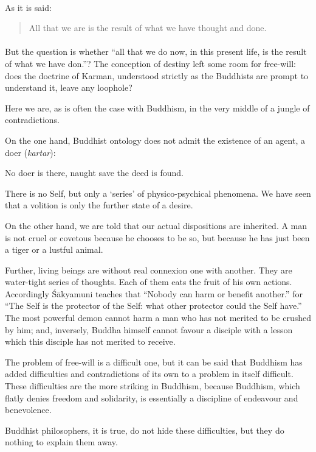 \documentclass[a4paper, 11pt, oneside, english, landscape]{article}
\begin{document}
\paragraph{}
As it is said:
\begin{quotation}
\small
All that we are is the result of what we have thought and done.
\end{quotation}
\paragraph{}
But the question is whether ``all that we do now, in this present life, is the result of what we have don.''? The conception of destiny left some room for free-will: does the doctrine of Karman, understood strictly as the Buddhists are prompt to understand it, leave any loophole?

Here we are, as is often the case with Buddhism, in the very middle of a jungle of contradictions.

On the one hand, Buddhist ontology does not admit the existence of an agent, a doer (\emph{kartar}):

No doer is there, naught save the deed is found.

There is no Self, but only a `series' of physico-psychical phenomena. We have seen that a volition is only the further state of a desire.

On the other hand, we are told that our actual dispositions are inherited. A man is not cruel or covetous because he chooses to be so, but because he has just been a tiger or a lustful animal.

Further, living beings are without real connexion one with another. They are water-tight series of thoughts. Each of them eats the fruit of his own actions. Accordingly Śākyamuni teaches that ``Nobody can harm or benefit another.'' for ``The Self is the protector of the Self: what other protector could the Self have.'' The most powerful demon cannot harm a man who has not merited to be crushed by him; and, inversely, Buddha himself cannot favour a disciple with a lesson which this disciple has not merited to receive.

The problem of free-will is a difficult one, but it can be said that Buddhism has added difficulties and contradictions of its own to a problem in itself difficult. These difficulties are the more striking in Buddhism, because Buddhism, which flatly denies freedom and solidarity, is essentially a discipline of endeavour and benevolence.

Buddhist philosophers, it is true, do not hide these difficulties, but they do nothing to explain them away.
\end{document}

